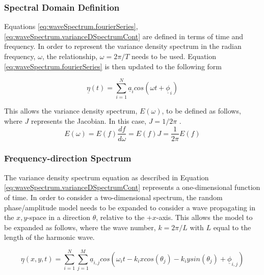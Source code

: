 


\subsubsection{Spectral Domain Definition} \label{subsec:theory.waves.waveSpectrum.spectralDef}
Equations \ref{eq:waveSpectrum.fourierSeries},\ref{eq:waveSpectrum.varianceDSpectrumCont} are defined in terms of time and frequency. In order to represent the variance density spectrum in the radian frequency, $\omega$, the relationship, $\omega = 2\pi/T$ needs to be used. Equation \ref{eq:waveSpectrum.fourierSeries} is then updated to the following form

\begin{equation} \label{eq:waveSpectrum.fourierSeries_omega}
    \underline{\eta}(t) = \sum_{i=1}^{N}\underline{a}_{i}cos(\omega t + \underline{\phi}_{i})
\end{equation}

This allows the variance density spectrum, $E(\omega)$, to be defined as follows, where $J$ represents the Jacobian. In this case, $J=1/2\pi$ \cite{Holthuijsen2007}.
\begin{equation} \label{eq:waveSpectrum.relateE(f)toE(w)}
    E(\omega) =  E(f) \frac{df}{d\omega} = E(f)J = \frac{1}{2\pi}E(f)
\end{equation}

\subsubsection{Frequency-direction Spectrum} \label{subsec:theory.waves.waveSpectrum.freqDirection}
The variance density spectrum equation as described in Equation \ref{eq:waveSpectrum.varianceDSpectrumCont} represents a one-dimensional function of time. In order to consider a two-dimensional spectrum, the random phase/amplitude model needs to be expanded to consider a wave propagating in the $x,y$-space in a direction $\theta$, relative to the +$x$-axis. This allows the model to be expanded as follows, where the wave number, $k = 2\pi/L$ \cite{Holthuijsen2007} with $L$ equal to the length of the harmonic wave.

\begin{equation} \label{eq:waveSpectrum.fourierSeries_3D}
    \underline{\eta}(x,y,t) = \sum_{i=1}^{N} \sum_{j=1}^{M} \underline{a}_{i,j}cos(\omega_{i}t-k_{i}xcos(\theta_{j}) - k_{i}ysin(\theta_{j}) + \underline{\phi}_{i,j})
\end{equation}

